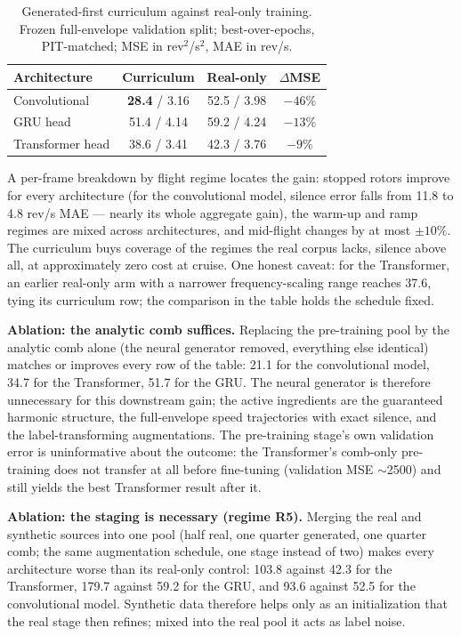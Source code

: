 \documentclass[journal]{IEEEtran}
\begin{document}
\begin{table}[t]
  \centering
  \caption{Generated-first curriculum against real-only training. Frozen
    full-envelope validation split; best-over-epochs, PIT-matched;
    MSE in rev$^2$/s$^2$, MAE in rev/s.}
  \label{tab:curriculum}
  \footnotesize
  \setlength{\tabcolsep}{4pt}
  \begin{tabular}{@{}lccc@{}}
    \toprule
    Architecture & Curriculum & Real-only & $\Delta$MSE \\
    \midrule
    Convolutional & \textbf{28.4} / 3.16 & 52.5 / 3.98 & $-46\%$ \\
    GRU head & 51.4 / 4.14 & 59.2 / 4.24 & $-13\%$ \\
    Transformer head & 38.6 / 3.41 & 42.3 / 3.76 & $-9\%$ \\
    \bottomrule
  \end{tabular}
\end{table}

A per-frame breakdown by flight regime locates the gain: stopped rotors
improve for every architecture (for the convolutional model, silence error
falls from 11.8 to 4.8 rev/s MAE --- nearly its whole aggregate gain), the
warm-up and ramp regimes are mixed across architectures, and mid-flight
changes by at most $\pm 10\%$. The curriculum buys coverage of the regimes
the real corpus lacks, silence above all, at approximately zero cost at
cruise. One honest caveat: for the Transformer, an earlier real-only arm with
a narrower frequency-scaling range reaches 37.6, tying its curriculum row;
the comparison in the table holds the schedule fixed.

\textbf{Ablation: the analytic comb suffices.} Replacing the pre-training
pool by the analytic comb alone (the neural generator removed, everything
else identical) matches or improves every row of the table: 21.1 for the
convolutional model, 34.7 for the Transformer, 51.7 for the GRU. The neural
generator is therefore unnecessary for this downstream gain; the active
ingredients are the guaranteed harmonic structure, the full-envelope speed
trajectories with exact silence, and the label-transforming augmentations.
The pre-training stage's own validation error is uninformative about the
outcome: the Transformer's comb-only pre-training does not transfer at all
before fine-tuning (validation MSE $\sim$2500) and still yields the best
Transformer result after it.

\textbf{Ablation: the staging is necessary (regime R5).} Merging the real
and synthetic sources into one pool (half real, one quarter generated, one quarter comb;
the same augmentation schedule, one stage instead of two) makes every
architecture worse than its real-only control: 103.8 against 42.3 for the
Transformer, 179.7 against 59.2 for the GRU, and 93.6 against 52.5 for
the convolutional model. Synthetic data
therefore helps only as an initialization that the real stage then refines;
mixed into the real pool it acts as label noise.
\end{document}
